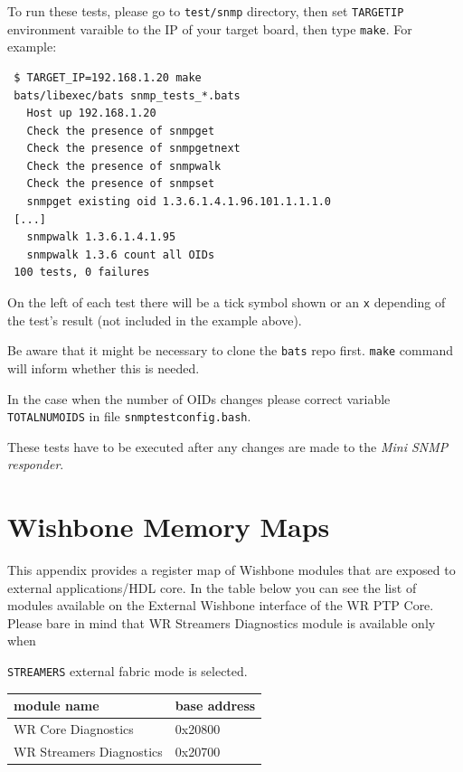 \documentclass[a4paper, 12pt]{article}
\renewcommand{\_}{\underscore\allowbreak}
\newcommand{\tts}[1]{
  \texttt{\small{#1}}}
\begin{document}
To run these tests, please go to \texttt{test/snmp} directory, then set
\texttt{TARGET\_IP} environment varaible to the IP of your target board, then type
\texttt{make}. For example:
\begin{lstlisting}
 $ TARGET_IP=192.168.1.20 make
 bats/libexec/bats snmp_tests_*.bats
   Host up 192.168.1.20
   Check the presence of snmpget
   Check the presence of snmpgetnext
   Check the presence of snmpwalk
   Check the presence of snmpset
   snmpget existing oid 1.3.6.1.4.1.96.101.1.1.1.0
 [...]
   snmpwalk 1.3.6.1.4.1.95
   snmpwalk 1.3.6 count all OIDs
 100 tests, 0 failures
\end{lstlisting}
On the left of each test there will be a tick symbol shown or an \texttt{x}
depending of the test's result (not included in the example above).

Be aware that it might be necessary to clone the \texttt{bats} repo first.
\texttt{make} command will inform whether this is needed.

In the case when the number of OIDs changes please correct variable \texttt{TOTAL\_NUM\_OIDS}
in file \texttt{snmp\_test\_config.bash}.

These tests have to be executed after any changes are made to the \textit{Mini SNMP
responder}.

\newpage
\section{Wishbone Memory Maps}
\label{sec:wb_mem_maps}

This appendix provides a register map of Wishbone modules that are exposed to
external applications/HDL core. In the table below you can see the list of
modules available on the External Wishbone interface of the WR PTP Core. Please
bare in mind that WR Streamers Diagnostics module is available only when
\tts{STREAMERS} external fabric mode is selected.
\begin{center}
\begin{tabular}{|l|l|}
  \hline
  module name & base address\\
  \hline \hline
  WR Core Diagnostics & 0x20800\\
  WR Streamers Diagnostics & 0x20700\\
  \hline
\end{tabular}
\end{center}


\newpage

\end{document}
